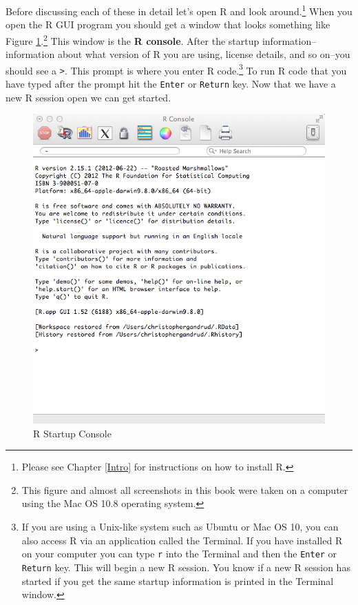 \documentclass[krantz1]{krantz}
\begin{document}
Before discussing each of these in detail let's open R and look around.\footnote{Please see Chapter \ref{Intro} for instructions on how to install R.} When you open the R GUI program you should get a window that looks something like Figure \ref{RBlankMain}.\footnote{This figure and almost all screenshots in this book were taken on a computer using the Mac OS 10.8 operating system.} This window is the {\bf{R console}}. After the startup information--information about what version of R you are using, license details, and so on--you should see a {\tt{\textgreater}}. This prompt is where you enter R code.\footnote{If you are using a Unix-like system such as Ubuntu or Mac OS 10, you can also access R via an application called the Terminal. If you have installed R on your computer you can type {\tt{r}} into the Terminal and then the {\tt{Enter}} or {\tt{Return}} key. This will begin a new R session. You know if a new R session has started if you get the same startup information is printed in the Terminal window.} To run R code that you have typed after the prompt hit the {\tt{Enter}} or {\tt{Return}} key. Now that we have a new R session open we can get started. 

\begin{figure}[th!]
    \caption{R Startup Console}
    \label{RBlankMain}
    \begin{center}
    \includegraphics[scale=0.4]{Children/Chapter3/images3/BlankRConsole.png}
    \end{center}
\end{figure}
\end{document}
